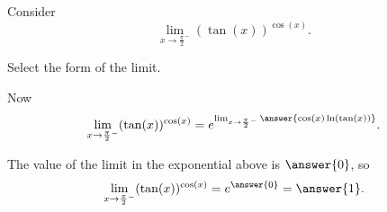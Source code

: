 \documentclass{ximera}
\author{Nela Lakos \and Kyle Parsons}
\begin{document}
\begin{exercise}

Consider
\[
\lim_{x\to\frac{\pi}{2}^-} (\tan(x))^{\cos(x)}.
\]

Select the form of the limit.
\begin{multipleChoice}
\choice{$\zeroToZero$}
\choice{$\oneToInfty$}
\choice[correct]{$\inftyToZero$}
\end{multipleChoice}

Now
\[
\lim_{x\to\frac{\pi}{2}^-} (\tan(x))^{\cos(x)} = e^{\lim_{x\to\frac{\pi}{2}^-}\answer{\cos(x) \ln(\tan(x))}}.
\]

The value of the limit in the exponential above is $\answer{0}$, so
\[
\lim_{x\to\frac{\pi}{2}^-} (\tan(x))^{\cos(x)} = e^{\answer{0}} = \answer{1}.
\]

\end{exercise}
\end{document}
